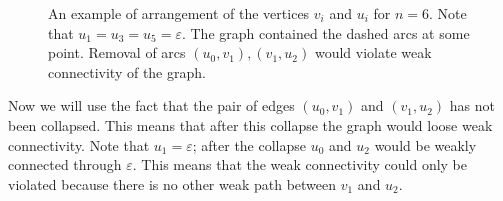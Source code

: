 \begin{figure}[ht]
\begin{center}

\end{center}

\caption{An example of arrangement of the vertices $ v_i $ and $ u_i $ for $ n = 6 $. Note that $u_1=u_3=u_5=\varepsilon$. The graph contained the dashed arcs at some point. Removal of arcs $(u_0, v_1), (v_1, u_2)$ would violate weak connectivity of the graph.}\label{fig:lvl2pathuv}
\end{figure}

Now we will use the fact that the pair of edges $ (u_0, v_1) $ and $ (v_1, u_2) $ has not been collapsed. This means that after this collapse the graph would loose weak connectivity. Note that $ u_1 = \varepsilon $; after the collapse $ u_0 $ and $ u_2 $ would be weakly connected through $ \varepsilon $. This means that the weak connectivity could only be violated because there is no other weak path between $ v_1 $ and $ u_2 $.

